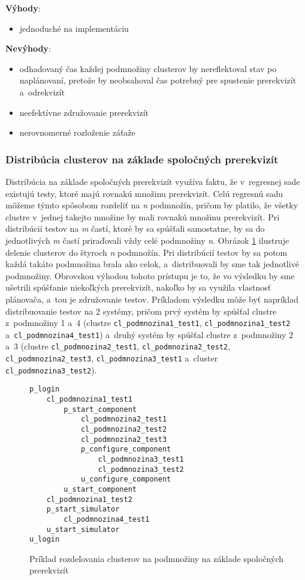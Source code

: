\noindent \textbf{Výhody}:
\begin{itemize}
\item jednoduché na implementáciu
\end{itemize} 

\noindent \textbf{Nevýhody}:
\begin{itemize}
\item odhadovaný čas každej podmnožiny clusterov by nereflektoval stav po naplánovaní, pretože by
neobsahoval čas potrebný pre spustenie prerekvizít a~odrekvizít
\item neefektívne združovanie prerekvizít
\item nerovnomerné rozloženie záťaže
\end{itemize}

\subsubsection*{Distribúcia clusterov na základe spoločných prerekvizít}
Distribúcia na základe spoločných prerekvizít využíva faktu, že v~regresnej sade existujú testy, ktoré majú rovnakú množinu prerekvizít.
Celú regresnú sadu môžeme týmto spôsobom rozdeliť na \emph{n} podmnožín, pričom by platilo, že všetky clustre v~jednej takejto množine by mali
rovnakú množinu prerekvizít. Pri distribúcií testov na \emph{m} častí, ktoré by sa spúšťali samostatne, by sa do jednotlivých \emph{m} častí
priraďovali vždy celé podmnožiny \emph{n}. Obrázok \ref{obrazok:podmnoziny_testov} ilustruje delenie clusterov do štyroch \emph{n} podmnožín.
Pri distribúcií testov by sa potom každá takáto podmnožina brala ako celok, a~distribuovali by sme tak jednotlivé podmnožiny.
Obrovskou výhodou tohoto prístupu je to, že vo výsledku by sme ušetrili spúšťanie niekoľkých prerekvizít, nakoľko by sa
využila vlastnosť plánovača, a~tou je združovanie testov. Príkladom výsledku môže byť napríklad distribuovanie testov na 2 systémy, 
pričom prvý systém by spúšťal clustre z~podmnožiny 1 a~4 (clustre \texttt{cl\_podmnozina1\_test1}, \texttt{cl\_podmnozina1\_test2} a~\texttt{cl\_podmnozina4\_test1})
a~druhý systém by spúšťal clustre z~podmnožiny 2 a~3 (clustre \texttt{cl\_podmnozina2\_test1}, \texttt{cl\_podmnozina2\_test2}, 
\texttt{cl\_podmnozina2\_test3}, \texttt{cl\_podmnozina3\_test1} a~cluster \texttt{cl\_podmnozina3\_test2}).


\begin{figure}[h]
\begin{lstlisting}
p_login
    cl_podmnozina1_test1
        p_start_component
            cl_podmnozina2_test1
            cl_podmnozina2_test2
            cl_podmnozina2_test3
            p_configure_component
                cl_podmnozina3_test1
                cl_podmnozina3_test2
            u_configure_component
        u_start_component
    cl_podmnozina1_test2
    p_start_simulator
        cl_podmnozina4_test1
    u_start_simulator
u_login
\end{lstlisting}
\caption{Príklad rozdeľovania clusterov na podmnožiny na základe spoločných prerekvizít}
\label{obrazok:podmnoziny_testov}
\end{figure}

